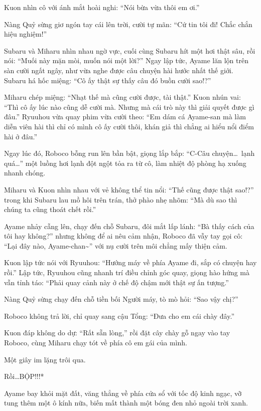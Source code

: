 \documentclass[../main.tex]{subfiles}
\begin{document}
Kuon nhìn cô với ánh mắt hoài nghi: ``Nói bừa vừa thôi em ơi.''

Nàng Quỷ sừng giơ ngón tay cái lên trời, cười tự mãn: ``Cứ tin tôi đi! Chắc chắn hiệu nghiệm!''

Subaru và Miharu nhìn nhau ngờ vực, cuối cùng Subaru hít một hơi thật sâu, rồi nói: ``Muối này mặn mòi, muốn nói một lời?'' Ngay lập tức, Ayame lăn lộn trên sàn cười ngất ngây, như vừa nghe được câu chuyện hài hước nhất thế giới. Subaru há hốc miệng: ``Cô ấy thật sự thấy câu đó buồn cười sao!?''

Miharu chép miệng: ``Nhạt thế mà cũng cười được, tài thật.'' Kuon nhún vai: ``Thì cô ấy lúc nào cũng dễ cười mà. Nhưng mà cái trò này thì giải quyết được gì đâu.'' Ryuuhou vừa quay phim vừa cười theo: ``Em dám cá Ayame-san mà làm diễn viên hài thì chỉ có mình cô ấy cười thôi, khán giả thì chẳng ai hiểu nổi điểm hài ở đâu.''

Ngay lúc đó, Roboco bỗng run lên bần bật, giọng lắp bắp: ``C-Câu chuyện\dots\ lạnh quá\dots'' một luồng hơi lạnh đột ngột tỏa ra từ cô, làm nhiệt độ phòng hạ xuống nhanh chóng.


Miharu và Kuon nhìn nhau với vẻ không thể tin nổi: ``Thế cũng được thật sao!?'' trong khi Subaru lau mồ hôi trên trán, thở phào nhẹ nhõm: ``Mà dù sao thì chúng ta cũng thoát chết rồi.''

Ayame nhảy cẫng lên, chạy đến chỗ Subaru, đôi mắt lấp lánh: ``Bà thấy cách của tôi hay không?'' nhưng không để ai nêu cảm nhận, Roboco đã vẫy tay gọi cô: ``Lại đây nào, Ayame-chan\~{}'' với nụ cười trên môi chẳng mấy thiện cảm.

Kuon lập tức nói với Ryuuhou: ``Hướng máy về phía Ayame đi, sắp có chuyện hay rồi.'' Lập tức, Ryuuhou cũng nhanh trí điều chỉnh góc quay, giọng hào hứng mà vẫn tỉnh táo: ``Phải quay cảnh này ở chế độ chậm mới thật sự ấn tượng.''

Nàng Quỷ sừng chạy đến chỗ tiền bối Người máy, tò mò hỏi: ``Sao vậy chị?''

Roboco không trả lời, chỉ quay sang cậu Tổng: ``Đưa cho em cái chày đây.''

Kuon đáp không do dự: ``Rất sẵn lòng,'' rồi đặt cây chày gỗ ngay vào tay Roboco, cùng Miharu chạy tót về phía cô em gái của mình.

Một giây im lặng trôi qua.

Rồi\dots *BỘP!!!*

Ayame bay khỏi mặt đất, văng thẳng về phía cửa sổ với tốc độ kinh ngạc, vỡ tung thêm một ô kính nữa, biến mất thành một bóng đen nhỏ ngoài trời xanh.
\end{document}
